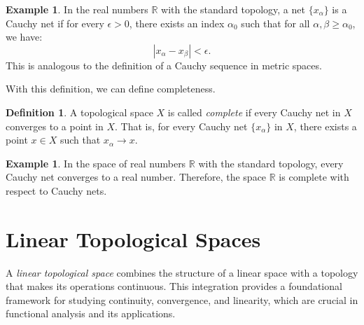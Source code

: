 \documentclass[12pt, reqno]{amsart}
\theoremstyle{definition}
\newtheorem{definition}[theorem]{Definition}
\newtheorem{example}[theorem]{Example}
\numberwithin{equation}{section}
\newcommand{\dR}{{\mathbb R}}
\begin{document}
\begin{example}
In the real numbers $ \dR $ with the standard topology, a net $\{x_\alpha\}$ is a Cauchy net if for every $\epsilon > 0$, there exists an index $\alpha_0$ such that for all $\alpha, \beta \geq \alpha_0$, we have:
$$ |x_\alpha - x_\beta| < \epsilon. $$
This is analogous to the definition of a Cauchy sequence in metric spaces.
\end{example}

With this definition, we can define completeness.

\begin{definition}
A topological space $X$ is called \textit{complete} if every Cauchy net in $X$ converges to a point in $X$. That is, for every Cauchy net $\{x_\alpha\}$ in $X$, there exists a point $x \in X$ such that $x_\alpha \to x$.
\end{definition}

\begin{example}
In the space of real numbers $ \dR $ with the standard topology, every Cauchy net converges to a real number. Therefore, the space $ \dR $ is complete with respect to Cauchy nets.
\end{example}

\vfill
\pagebreak

\section{Linear Topological Spaces}
A \textit{linear topological space} combines the structure of a linear space with a topology that makes its operations continuous. This integration provides a foundational framework for studying continuity, convergence, and linearity, which are crucial in functional analysis and its applications.
\end{document}
